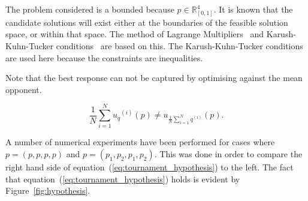 \documentclass[10pt]{article}
\newcommand{\R}{\mathbb{R}}
\begin{document}
The problem considered is a bounded because \(p \in \R^4_{[0, 1]}\). It is known that
the candidate solutions will exist either at the boundaries
of the feasible solution space, or within that space. The method of Lagrange
Multipliers~\cite{bertsekas2014} and Karush-Kuhn-Tucker conditions~\cite{Giorgi2016}
are based on this. The Karush-Kuhn-Tucker conditions are used here because the constraints
are inequalities.

Note that the best response can not be captured by optimising against the mean
opponent.

\begin{equation}\label{eq:tournament_hypothesis}
    \frac{1}{N} \sum_{i=1} ^ {N} {u_q}^{(i)} (p) \neq
      u_{\frac {1}{N} \sum\limits_{i=1} ^ N q^{(i)}}(p).
\end{equation}

A number of numerical experiments have been performed for cases where \(p=(p, p, p, p)\)
and \(p= (p_1, p_2, p_1, p_2)\). This was done in order to compare the right hand
side of equation~(\ref{eq:tournament_hypothesis}) to the left. The fact that
equation~(\ref{eq:tournament_hypothesis}) holds is evident by Figure~\ref{fig:hypothesis}.
\end{document}
